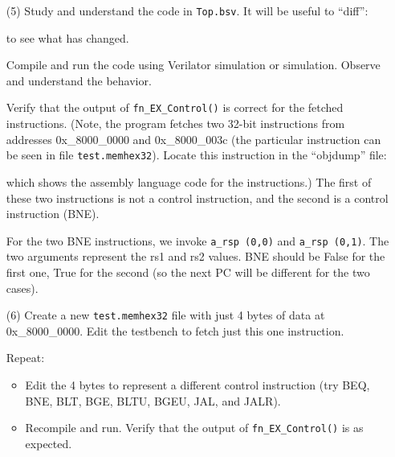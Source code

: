\begin{itemize}

\item[(5)] Study and understand the code in \verb|Top.bsv|. It will be
    useful to ``diff'':

    to see what has changed.

    Compile and run the code using Verilator simulation or {\BLUESIM}
    simulation.  Observe and understand the behavior.

    Verify that the output of \verb|fn_EX_Control()| is correct for
    the fetched instructions. (Note, the program fetches two 32-bit
    instructions from addresses 0x\_8000\_0000 and 0x\_8000\_003c (the
    particular instruction can be seen in file \verb|test.memhex32|).
    Locate this instruction in the ``objdump'' file:


    which shows the assembly language code for the instructions.)
    The first of these two instructions is not a control
    instruction, and the second is a control instruction (BNE).

    For the two BNE instructions, we invoke \verb|a_rsp (0,0)| and
    \verb|a_rsp (0,1)|.  The two arguments represent the rs1 and rs2
    values.  BNE should be False for the first one, True for the
    second (so the next PC will be different for the two cases).

\item[(6)] Create a new \verb|test.memhex32| file with just 4 bytes of
    data at 0x\_8000\_0000.  Edit the testbench to fetch just this one
    instruction.

    Repeat:
    \begin{itemize}

    \item Edit the 4 bytes to represent a different control instruction
          (try BEQ, BNE, BLT, BGE, BLTU, BGEU, JAL, and JALR).

    \item Recompile and run. Verify that the output of
          \verb|fn_EX_Control()| is as expected.

    \end{itemize}

\end{itemize}

